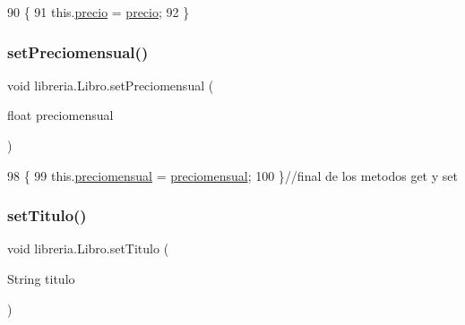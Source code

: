\begin{DoxyCode}
90                                         \{
91         this.\mbox{\hyperlink{classlibreria_1_1_libro_ab19a3f31d2aaab1bca6ba4f188951adc}{precio}} = \mbox{\hyperlink{classlibreria_1_1_libro_ab19a3f31d2aaab1bca6ba4f188951adc}{precio}};
92     \}
\end{DoxyCode}
\mbox{\label{classlibreria_1_1_libro_acfd01d2c473e359ace0d642597d1b271}} 
\subsubsection{\texorpdfstring{set\+Preciomensual()}{setPreciomensual()}}
{\footnotesize\ttfamily void libreria.\+Libro.\+set\+Preciomensual (\begin{DoxyParamCaption}\item[{float}]{preciomensual }\end{DoxyParamCaption})\hspace{0.3cm}{\ttfamily [inline]}}


\begin{DoxyCode}
98                                                       \{
99         this.\mbox{\hyperlink{classlibreria_1_1_libro_aa3ecf9746a1de3547b71c154ffbcbeb7}{preciomensual}} = \mbox{\hyperlink{classlibreria_1_1_libro_aa3ecf9746a1de3547b71c154ffbcbeb7}{preciomensual}};
100     \}\textcolor{comment}{//final de los metodos get y set}
\end{DoxyCode}
\mbox{\label{classlibreria_1_1_libro_a698c25403141da07d2a4e5dc337d8419}} 
\subsubsection{\texorpdfstring{set\+Titulo()}{setTitulo()}}
{\footnotesize\ttfamily void libreria.\+Libro.\+set\+Titulo (\begin{DoxyParamCaption}\item[{String}]{titulo }\end{DoxyParamCaption})\hspace{0.3cm}{\ttfamily [inline]}}


